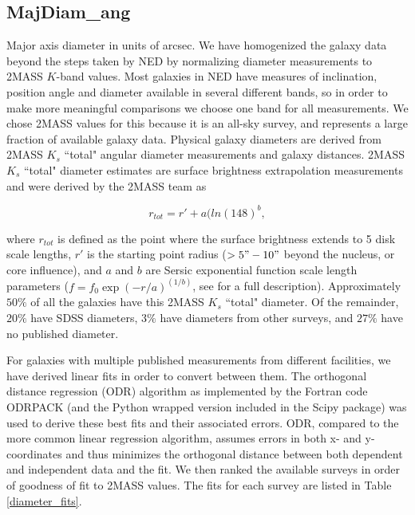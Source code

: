 \subsection{MajDiam\_ang} \label{diameters}
Major axis diameter in units of arcsec. We have homogenized the galaxy data beyond the steps taken by NED by normalizing diameter measurements to 2MASS $K$-band values. Most galaxies in NED have measures of inclination, position angle and diameter available in several different bands, so in order to make more meaningful comparisons we choose one band for all measurements. We chose 2MASS values for this because it is an all-sky survey, and represents a large fraction of available galaxy data. Physical galaxy diameters are derived from 2MASS $K_s$ ``total" angular diameter measurements and galaxy distances. 2MASS $K_s$ ``total" diameter estimates are surface brightness extrapolation measurements and were derived by the 2MASS team as 

\begin{equation}
r_{tot} = r' + a(ln(148)^b,
\end{equation}

\noindent where $r_{tot}$ is defined as the point where the surface brightness extends to 5 disk scale lengths, $r'$ is the starting point radius ($>5" - 10"$ beyond the nucleus, or core influence), and $a$ and $b$ are Sersic exponential function scale length parameters ($f = f_0 \exp{(-r/a)}^{(1/b)}$, see \citealt{jarrett2003} for a full description). Approximately $50\%$ of all the galaxies have this 2MASS $K_s$ ``total" diameter. Of the remainder, $20\%$ have SDSS diameters, $3\%$ have diameters from other surveys, and $27\%$ have no published diameter. 

For galaxies with multiple published measurements from different facilities, we have derived linear fits in order to convert between them. The orthogonal distance regression (ODR) algorithm as implemented by the Fortran code ODRPACK (and the Python wrapped version included in the Scipy package) was used to derive these best fits and their associated errors. ODR, compared to the more common linear regression algorithm, assumes errors in both x- and y-coordinates and thus minimizes the orthogonal distance between both dependent and independent data and the fit. We then ranked the available surveys in order of goodness of fit to 2MASS values. The fits for each survey are listed in Table \ref{diameter_fits}. 


